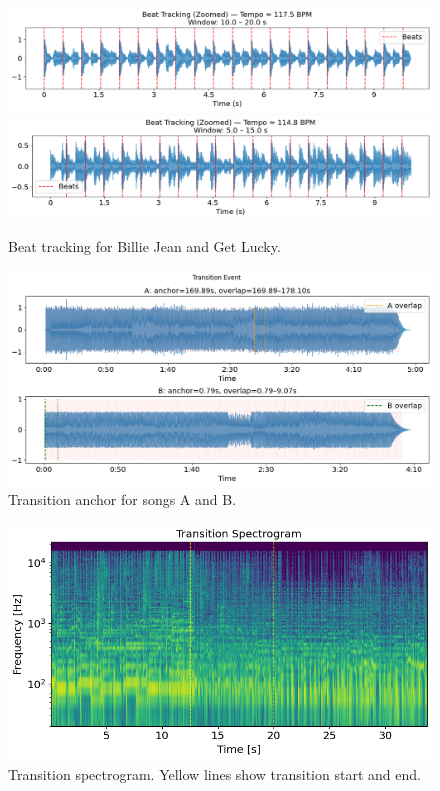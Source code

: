 \documentclass[12pt]{article}
\begin{document}
\begin{figure}[H]
    \centering
    \includegraphics[width=\textwidth]{figures/beat_tracking_bj.png}
    \includegraphics[width=\textwidth]{figures/beat_tracking_gl.png}
    \caption{Beat tracking for Billie Jean and Get Lucky.}
\end{figure}

\begin{figure}[H]
    \centering
    \includegraphics[width=\textwidth]{figures/transition.png}
    \caption{Transition anchor for songs A and B.}
\end{figure}

\begin{figure}[H]
    \centering
    \includegraphics[width=\textwidth]{figures/spectogram.png}
    \caption{Transition spectrogram. Yellow lines show transition start and end.}
\end{figure}
\end{document}
